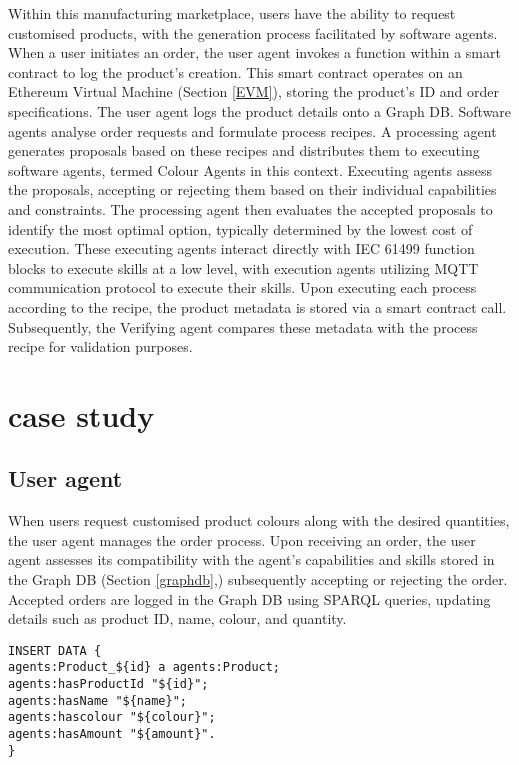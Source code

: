 \documentclass[conference]{IEEEtran}
\begin{document}
Within this manufacturing marketplace, users have the ability to request customised products, with the generation process facilitated by software agents. When a user initiates an order, the user agent invokes a function within a smart contract to log the product's creation. This smart contract operates on an Ethereum Virtual Machine (Section \ref{EVM}), storing the product's ID and order specifications. The user agent logs the product details onto a Graph DB. Software agents analyse order requests and formulate process recipes. A processing agent generates proposals based on these recipes and distributes them to executing software agents, termed Colour Agents in this context. Executing agents assess the proposals, accepting or rejecting them based on their individual capabilities and constraints. The processing agent then evaluates the accepted proposals to identify the most optimal option, typically determined by the lowest cost of execution. These executing agents interact directly with IEC 61499 function blocks to execute skills at a low level, with execution agents utilizing MQTT communication protocol to execute their skills. Upon executing each process according to the recipe, the product metadata is stored via a smart contract call. Subsequently, the Verifying agent compares these metadata with the process recipe for validation purposes.


\section{case study}
\label{sec:casestudy}


\subsection{User agent}

When users request customised product colours along with the desired quantities, the user agent manages the order process. Upon receiving an order, the user agent assesses its compatibility with the agent's capabilities and skills stored in the Graph DB (Section \ref{graphdb},) subsequently accepting or rejecting the order. Accepted orders are logged in the Graph DB using SPARQL queries, updating details such as product ID, name, colour, and quantity. 


\begin{lstlisting}
INSERT DATA {
agents:Product_${id} a agents:Product;
agents:hasProductId "${id}";
agents:hasName "${name}";
agents:hascolour "${colour}";
agents:hasAmount "${amount}".
}
\end{lstlisting}
\end{document}
